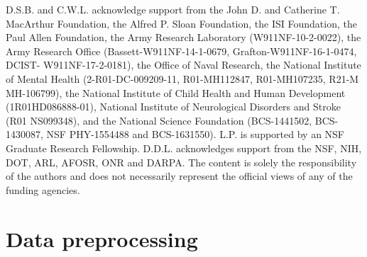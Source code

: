 \documentclass[aps,reprint,superscriptaddress,amsmath,amssymb,longbibliography]{revtex4-1}
\begin{document}
\begin{acknowledgments}
D.S.B. and C.W.L. acknowledge support from the John D. and Catherine T. MacArthur Foundation, the Alfred P. Sloan Foundation, the ISI Foundation, the Paul Allen Foundation, the Army Research Laboratory (W911NF-10-2-0022), the Army Research Office (Bassett-W911NF-14-1-0679, Grafton-W911NF-16-1-0474, DCIST- W911NF-17-2-0181), the Office of Naval Research, the National Institute of Mental Health (2-R01-DC-009209-11, R01-MH112847, R01-MH107235, R21-M MH-106799), the National Institute of Child Health and Human Development (1R01HD086888-01), National Institute of Neurological Disorders and Stroke (R01 NS099348), and the National Science Foundation (BCS-1441502, BCS-1430087, NSF PHY-1554488 and BCS-1631550). L.P. is supported by an NSF Graduate Research Fellowship. D.D.L. acknowledges support from the NSF, NIH, DOT, ARL, AFOSR, ONR and DARPA. The content is solely the responsibility of the authors and does not necessarily represent the official views of any of the funding agencies. 
\end{acknowledgments}

\appendix

\section{Data preprocessing}

\label{Data}
\end{document}
